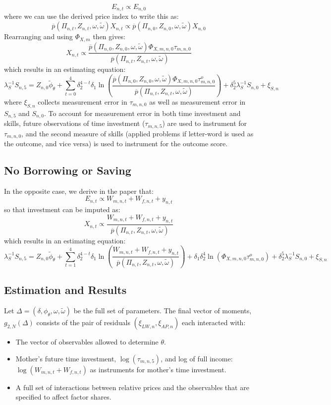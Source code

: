 \documentclass{article}
\begin{document}
\[ E_{n,t} \propto E_{n,0} \]
where we can use the derived price index to write this as:
\[ \overline{p}(\Pi_{n,t},Z_{n,t},\omega,\tilde{\omega})X_{n,t} \propto \overline{p}(\Pi_{n,0},Z_{n,0},\omega,\tilde{\omega})X_{n,0} \]
Rearranging and using $\Phi_{X,m}$ then gives:
\[ X_{n,t} \propto \frac{\overline{p}(\Pi_{n,0},Z_{n,0},\omega,\tilde{\omega})\Phi_{X,m,n,0}\tau_{m,n,0}}{\overline{p}(\Pi_{n,t},Z_{n,t},\omega,\tilde{\omega})}\]
which results in an estimating equation:
\[\lambda^{-1}_{S}S_{n,5} = Z_{n,0}\tilde{\phi}_\theta + \sum_{t=0}^4\delta_{2}^{4-t}\delta_{1}\ln\left(\frac{\overline{p}(\Pi_{n,0},Z_{n,0},\omega,\tilde{\omega})\Phi_{X,m,n,0}\tau^{o}_{m,n,0}}{\overline{p}(\Pi_{n,t},Z_{n,t},\omega,\tilde{\omega})}\right) + \delta^5_{2}\lambda_{S}^{-1}S_{n,0} + \xi_{S,n} \]
where $\xi_{S,n}$ collects measurement error in $\tau_{m,n,0}$ as well as measurement error in $S_{n,5}$ and $S_{n,0}$. To account for measurement error in both time investment and skills, future observations of time investment ($\tau_{m,n,5}$) are used to instrument for $\tau_{m,n,0}$, and the second measure of skills (applied problems if letter-word is used as the outcome, and vice versa) is used to instrument for the outcome score.

\subsection*{No Borrowing or Saving}
In the opposite case, we derive in the paper that:
\[ E_{n,t} \propto W_{m,n,t}+W_{f,n,t}+y_{n,t} \]
so that investment can be imputed as:
\[ X_{n,t} \propto \frac{W_{m,n,t}+W_{f,n,t}+y_{n,t}}{\overline{p}(\Pi_{n,t},Z_{n,t},\omega,\tilde{\omega})} \]
which results in an estimating equation:
\[\lambda^{-1}_{S}S_{n,5} = Z_{n,0}\tilde{\phi}_\theta + \sum_{t=1}^4\delta_{2}^{4-t}\delta_{1}\ln\left(\frac{W_{m,n,t}+W_{f,n,t}+y_{n,t}}{\overline{p}(\Pi_{n,t},Z_{n,t},\omega,\tilde{\omega})}\right) + \delta_{1}\delta_{2}^4\ln\left(\Phi_{X,m,n,0}\tau^{o}_{m,n,0}\right) + \delta^5_{2}\lambda_{S}^{-1}S_{n,0} + \xi_{S,n} \]

\subsection*{Estimation and Results}
Let $\Delta=(\delta,\phi_{\theta},\omega,\tilde{\omega})$ be the full set of parameters. The final vector of moments, $g_{2,N}(\Delta)$ consists of the pair of residuals $(\xi_{LW,n},\xi_{AP,n})$ each interacted with:
\begin{itemize}
    \item The vector of observables allowed to determine $\theta$.
    \item Mother's future time investment, $\log(\tau_{m,n,5})$, and log of full income: $\log(W_{m,n,t}+W_{f,n,t})$ as instruments for mother's time investment.
    \item A full set of interactions between relative prices and the observables that are specified to affect factor shares.
\end{itemize}
\end{document}
